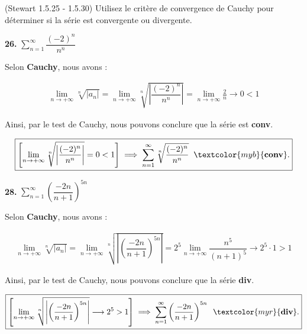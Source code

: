 \documentclass{report}
\begin{document}
    \begin{Exercice}{(Stewart 1.5.25 - 1.5.30)}{}
        Utilisez le critère de convergence de Cauchy pour déterminer si la  
        série est convergente ou divergente.
    \end{Exercice}

    \vspace{1em}%
    
    \noindent
    \textbf{26.} $\sum_{n=1}^{\infty }\dfrac{(-2)^n}{n^n}$  

    Selon \textbf{Cauchy}, nous avons : 

    \begin{align*}
        \lim\limits_{n \to+\infty } \sqrt[n]{|a_n|} = 
        \lim\limits_{n \to+\infty } \sqrt[n]{\left|\dfrac{(-2)^n}{n^n}\right|} =
        \lim\limits_{n \to+\infty } \frac{2}{n} \longrightarrow 0 < 1  
    \end{align*}

    Ainsi, par le test de Cauchy, nous pouvons conclure que la série est \textcolor{myb}{\textbf{conv}}. 

    \begin{align*}
        \boxed{
        \left[\lim\limits_{n \to+\infty } \sqrt[n]{\left| \dfrac{(-2)^n}{n^n} \right|} = 0 < 1 \right] 
        \implies 
        \sum_{n=1}^{\infty } \sqrt[n]{\dfrac{(-2)^n}{n^n}} \;\; \textcolor{myb}{\textbf{conv}}. 
    }
    \end{align*}

    \vspace{1em}
    \noindent
    \textbf{28.}  $\sum_{n=1}^{\infty }\left(  \dfrac{-2n}{n+1} \right)^{5n}$ 

    \vspace{1em}
    Selon \textbf{Cauchy}, nous avons : 

    \begin{align*}
        \lim\limits_{n \to+\infty } \sqrt[n]{\left| a_n \right|} = 
        \lim\limits_{n \to+\infty }  \sqrt[n]{\left| \left(  \dfrac{-2n}{n+1} \right)^{5n} \right|} = 
        2^5 \lim\limits_{n \to+\infty } \dfrac{n^5}{(n + 1)^5} \longrightarrow 2^5 \cdot 1 > 1
    \end{align*}

    Ainsi, par le test de Cauchy, nous pouvons conclure que la série \textcolor{myr}{\textbf{div}}. 


    \begin{align*}
        \boxed{
        \left[ \lim\limits_{n \to+\infty } \sqrt[n]{\left| \left(  \dfrac{-2n}{n+1} \right)^{5n} \right|}  
        \longrightarrow 2^5 > 1 \right]
        \implies \sum_{n=1}^{\infty }\left(  \dfrac{-2n}{n+1} \right)^{5n} \;\; \textcolor{myr}{\textbf{div}}.
    }
    \end{align*}
\end{document}
